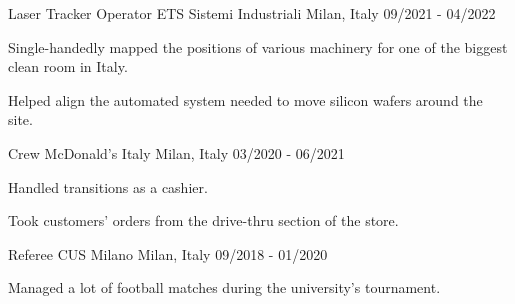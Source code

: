 


\begin{cventries}


\cventry
{Laser Tracker Operator} %
{ETS Sistemi Industriali} %
{Milan, Italy} %
{09/2021 - 04/2022} %
{ %
\begin{cvitems}
\item {Single-handedly mapped the positions of various machinery for one of the biggest clean room in Italy.}
\item {Helped align the automated system needed to move silicon wafers around the site.}
\end{cvitems}
}

\cventry
{Crew} %
{McDonald's Italy} %
{Milan, Italy} %
{03/2020 - 06/2021} %
{ %
\begin{cvitems}
\item {Handled transitions as a cashier.}
\item {Took customers' orders from the drive-thru section of the store.}
\end{cvitems}
}
\cventry
{Referee} %
{CUS Milano} %
{Milan, Italy} %
{09/2018 - 01/2020} %
{ %
\begin{cvitems}
\item {Managed a lot of football matches during the university's tournament.}
\end{cvitems}
}

\end{cventries}